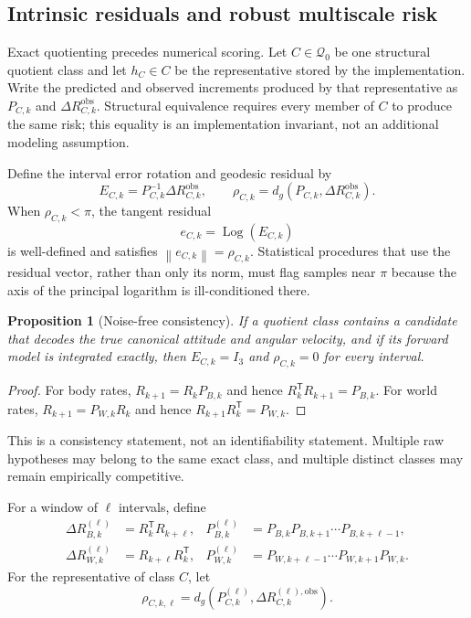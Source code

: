 \documentclass[11pt]{article}
\newtheorem{proposition}[theorem]{Proposition}
\newcommand{\I}{I_3}
\newcommand{\T}{\mathsf{T}}
\newcommand{\Log}{\operatorname{Log}}
\newcommand{\norm}[1]{\left\lVert #1 \right\rVert}
\begin{document}
    \subsection{Intrinsic residuals and robust multiscale risk}

    Exact quotienting precedes numerical scoring. Let $C\in\mathcal Q_0$ be one structural
    quotient class and let $h_C\in C$ be the representative stored by the implementation.
    Write the predicted and observed increments produced by that representative as
    $P_{C,k}$ and $\Delta R_{C,k}^{\mathrm{obs}}$. Structural equivalence requires every
    member of $C$ to produce the same risk; this equality is an implementation invariant,
    not an additional modeling assumption.

    Define the interval error rotation and geodesic residual by
    \begin{equation}
        E_{C,k}=P_{C,k}^{-1}\Delta R_{C,k}^{\mathrm{obs}},
        \qquad
        \rho_{C,k}=d_g(P_{C,k},\Delta R_{C,k}^{\mathrm{obs}}).
    \end{equation}
    When $\rho_{C,k}<\pi$, the tangent residual
    \begin{equation}
        e_{C,k}=\Log(E_{C,k})
    \end{equation}
    is well-defined and satisfies $\norm{e_{C,k}}=\rho_{C,k}$. Statistical procedures that
    use the residual vector, rather than only its norm, must flag samples near $\pi$ because
    the axis of the principal logarithm is ill-conditioned there.

    \begin{proposition}[Noise-free consistency]
If a quotient class contains a candidate that decodes the true canonical attitude and
angular velocity, and if its forward model is integrated exactly, then
$E_{C,k}=\I$ and $\rho_{C,k}=0$ for every interval.
    \end{proposition}

    \begin{proof}
        For body rates, $R_{k+1}=R_kP_{B,k}$ and hence $R_k^{\T} R_{k+1}=P_{B,k}$. For world
        rates, $R_{k+1}=P_{W,k}R_k$ and hence $R_{k+1}R_k^{\T}=P_{W,k}$.
    \end{proof}

    This is a consistency statement, not an identifiability statement. Multiple raw
    hypotheses may belong to the same exact class, and multiple distinct classes may remain
    empirically competitive.

    For a window of $\ell$ intervals, define
    \begin{align}
        \Delta R_{B,k}^{(\ell)}&=R_k^{\T} R_{k+\ell},
        &P_{B,k}^{(\ell)}&=P_{B,k}P_{B,k+1}\cdots P_{B,k+\ell-1},\\
        \Delta R_{W,k}^{(\ell)}&=R_{k+\ell}R_k^{\T},
        &P_{W,k}^{(\ell)}&=P_{W,k+\ell-1}\cdots P_{W,k+1}P_{W,k}.
    \end{align}
    For the representative of class $C$, let
    \begin{equation}
        \rho_{C,k,\ell}
        =d_g\!\left(P_{C,k}^{(\ell)},\Delta R_{C,k}^{(\ell),\mathrm{obs}}\right).
    \end{equation}
\end{document}
